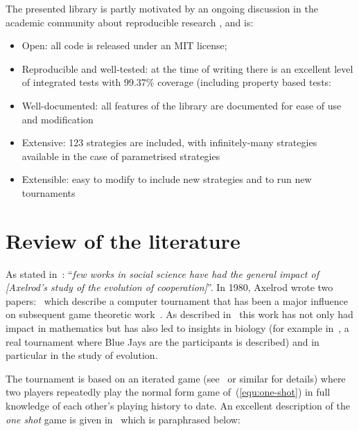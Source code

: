 \documentclass{jors}
\begin{document}
The presented library is partly motivated by an ongoing discussion in the academic community
about reproducible research \cite{Crick2014a, Hong2015a, Prlic2012, Sandve2013},
and is:

\begin{itemize}[noitemsep,topsep=0pt]
    \item Open: all code is released under an MIT license;
    \item Reproducible and well-tested: at the time of writing there is an excellent level of
        integrated tests with 99.37\% coverage (including property based tests:
        \cite{Hypothesis3.0.3}
    \item Well-documented: all features of the library are documented for ease of
        use and modification
    \item Extensive: 123 strategies are included, with infinitely-many
        strategies available in the case of parametrised strategies
    \item Extensible: easy to modify to include new strategies and to run new tournaments
\end{itemize}

\section*{Review of the literature}\label{sec:review}

As stated in~\cite{Bendor1991}: ``\textit{few works in social science have had
the general impact of [Axelrod's study of the evolution of cooperation]}''.  In
1980, Axelrod wrote two papers:~\cite{Axelrod1980a,Axelrod1980b} which
describe a computer tournament that has been a major influence on
subsequent game theoretic work~\cite{Banks1990, Bendor1991, Boyd1987, Chellapilla1999,
DavidB1993, Doebeli2005, Ellison1994, Gotts2003, Hilbe2013, Isaac2008,
Kraines1989, Lee2015, Lorberbaum1994, Milgrom1982, Molander1985, Murnighan2015,
Press2012, Stephens2002, Stewart2012}. As described in~\cite{Bendor1991} this
work has not only had impact in mathematics but has also led to insights in
biology (for example in~\cite{Stephens2002}, a real tournament where Blue Jays
are the participants is described) and in particular in the study of evolution.

The tournament is based on an iterated game (see~\cite{Maschler2013} or similar
for details) where two players repeatedly play the normal form game
of~(\ref{equ:one-shot}) in full knowledge of each other's playing history to
date.  An excellent description of the \textit{one shot} game is given
in~\cite{Gotts2003} which is paraphrased below:
\end{document}
